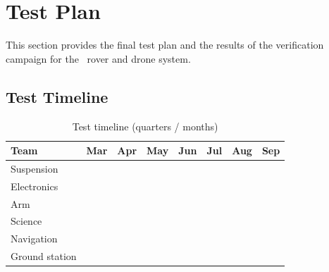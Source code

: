 %
%

\section{Test Plan}
\label{sec:test_plan}

This section provides the final test plan and the results of the verification
campaign for the \teamname\ rover and drone system.

\subsection{Test Timeline}
\label{subsec:tp_timeline}

\label{subsec:tp_timeline}

\begin{table}[!htbp]
    \centering
    \caption{Test timeline (quarters / months)}
    \label{tab:test_timeline}
    \renewcommand{\arraystretch}{1.1}
    \begin{tabular}{L{3.4cm} C{1.0cm} C{1.0cm} C{1.0cm} C{1.0cm} C{1.0cm} C{1.0cm} C{1.0cm}}
        \toprule
        \textbf{Team} & \textbf{Mar} & \textbf{Apr} & \textbf{May}
                     & \textbf{Jun} & \textbf{Jul} & \textbf{Aug} & \textbf{Sep} \\
        \midrule
        Suspension      &  &  &  &  &  &  & \\
        Electronics     &  &  &  &  &  &  & \\
        Arm             &  &  &  &  &  &  & \\
        Science         &  &  &  &  &  &  & \\
        Navigation      &  &  &  &  &  &  & \\
        Ground station  &  &  &  &  &  &  & \\
        \bottomrule
    \end{tabular}
\end{table}



